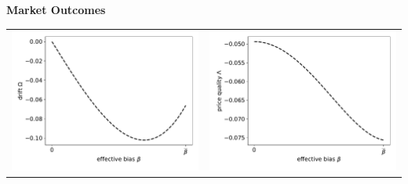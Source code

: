 \documentclass{article}
\begin{document}
\pagebreak
\begin{center}
	\textbf{Market Outcomes}
\end{center}
\begin{tabular}{cc}
	\includegraphics[scale=.5]{effective_bias_drift} & \includegraphics[scale=.5]{effective_bias_price_quality} \\

\end{tabular}
\end{document}
